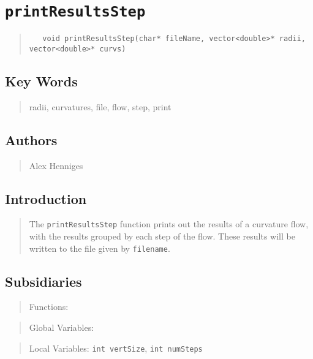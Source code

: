 \documentclass[10pt]{article}%
\begin{document}

\section*{\texttt{printResultsStep}}

\label{f0}\begin{quotation} {\small{\begin{verbatim} 
   void printResultsStep(char* fileName, vector<double>* radii, vector<double>* curvs)
   \end{verbatim}
}}
\end{quotation}
\subsection*{Key Words}

\begin{quotation} radii, curvatures, file, flow, step, print\end{quotation}

\subsection*{Authors}

\begin{quotation} Alex Henniges\end{quotation}

\subsection*{Introduction}

\begin{quotation} The \texttt{printResultsStep} function prints out the results of a curvature flow, with the results grouped by each step of the flow. These results will be written to the file given by \texttt{filename}.\end{quotation}

\subsection*{Subsidiaries}

\begin{quotation} Functions:\end{quotation}
\begin{quotation} Global Variables:\end{quotation}
\begin{quotation} Local Variables: \texttt{int vertSize}, \texttt{int numSteps}\end{quotation}
\end{document}
